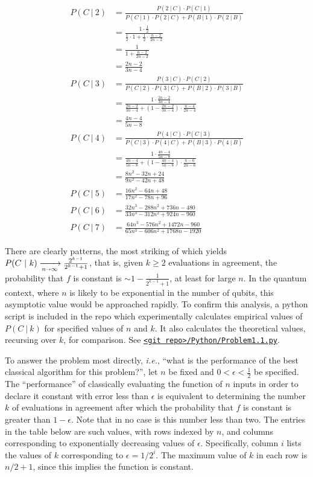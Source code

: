 \begin{align*}
P(C\ |\  2)&=\frac{P(2\ |\ C)\cdot P(C\ |\ 1)}{ P(C\ |\ 1) \cdot P(2\ |\ C) +  P(B\ |\ 1) \cdot P(2\ |\ B)} \\
&=\frac{1\cdot\frac12}{\frac12\cdot1+\frac12\cdot\frac{n-2}{2n-2}} \\
&=\frac{1}{1+\frac{n-2}{2n-2}} \\
&=\frac{2n-2}{3n-4} \\
P(C\ |\ 3)&=\frac{P(3\ |\ C)\cdot P(C\ |\ 2)}{ P(C\ |\ 2) \cdot P(3\ |\ C) +  P(B\ |\ 2) \cdot P(3\ |\ B)} \\
&=\frac{1\cdot\frac{2n-2}{3n-4}}{\frac{2n-2}{3n-4}+\left(1-\frac{2n-2}{3n-4}\right)\cdot\frac{n-4}{2n-4}} \\
&=\frac{4n-4}{5n-8} \\
P(C\ |\ 4)&=\frac{P(4\ |\ C)\cdot P(C\ |\ 3)}{ P(C\ |\ 3) \cdot P(4\ |\ C) +  P(B\ |\ 3) \cdot P(4\ |\ B)} \\
&=\frac{1\cdot\frac{4n-4}{5n-8}}{\frac{4n-4}{5n-8}+\left(1-\frac{4n-4}{5n-8}\right)\cdot\frac{n-6}{2n-6}} \\
&=\frac{8n^2-32n+24}{9n^2-42n+48} \\
P(C\ |\ 5)&=\frac{16n^2-64n+48}{17n^2-78n+96} \\
P(C\ |\ 6)&=\frac{32n^3-288n^2+736n-480}{33n^3-312n^2+924n-960} \\
P(C\ |\ 7)&=\frac{64n^3-576n^2+1472n-960}{65n^3-606n^2+1768n-1920}
\end{align*}

There are clearly patterns, the most striking of which yields $P(C\ |\ k)\xrightarrow[n\shortrightarrow\infty]{}\frac{2^{k-1}}{2^{k-1}+1}$, that is, given $k\geq2$ evaluations in agreement, the probability that $f$ is constant is ${\sim}1-\frac{1}{2^{k-1}+1}$, at least for large $n$.  In the quantum context, where $n$ is likely to be exponential in the number of qubits, this asymptotic value would be approached rapidly.  To confirm this analysis, a python script is included in the repo which experimentally calculates empirical values of $P(C\ |\ k)$ for specified values of $n$ and $k$.  It also calculates the theoretical values, recursing over $k$, for comparison.  See \href{https://github.com/tlesaul2/SolutionQCQINielsenChuang/blob/master/Python/Problem1.1.py}{\texttt{<git repo>/Python/Problem1.1.py}}.

To answer the problem most directly, \textit{i.e.}, ``what is the performance of the best classical algorithm for this problem?'', let $n$ be fixed and $0<\epsilon<\frac{1}{2}$ be specified.  The ``performance'' of classically evaluating the function of $n$ inputs in order to declare it constant with error less than $\epsilon$  is equivalent to determining the number $k$ of evaluations in agreement after which the probability that $f$ is constant is greater than $1-\epsilon$.  Note that in no case is this number less than two.  The entries in the table below are such values, with rows indexed by $n$, and columns corresponding to exponentially decreasing values of $\epsilon$.  Specifically, column $i$ lists the values of $k$ corresponding to $\epsilon = 1/2^i$.  The maximum value of $k$  in each row is $n/2+1$, since this implies the function is constant.

